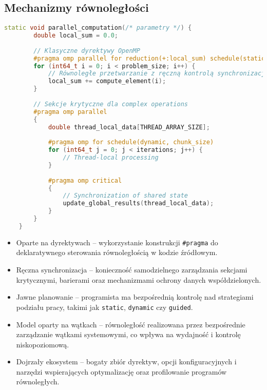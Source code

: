 \subsection{Mechanizmy równoległości}
\begin{lstlisting}[language=C++, caption={Mechanizmy równoległości w benchmarkach C++ z OpenMP}, label={lst:openmp_parallelism}]
    static void parallel_computation(/* parametry */) {
        double local_sum = 0.0;
        
        // Klasyczne dyrektywy OpenMP
        #pragma omp parallel for reduction(+:local_sum) schedule(static)
        for (int64_t i = 0; i < problem_size; i++) {
            // Równoległe przetwarzanie z ręczną kontrolą synchronizacji
            local_sum += compute_element(i);
        }
        
        // Sekcje krytyczne dla complex operations
        #pragma omp parallel
        {
            double thread_local_data[THREAD_ARRAY_SIZE];
            
            #pragma omp for schedule(dynamic, chunk_size)
            for (int64_t j = 0; j < iterations; j++) {
                // Thread-local processing
            }
            
            #pragma omp critical
            {
                // Synchronization of shared state
                update_global_results(thread_local_data);
            }
        }
    }
\end{lstlisting}
\begin{itemize}
    \item Oparte na dyrektywach – wykorzystanie konstrukcji \texttt{\#pragma} do deklaratywnego sterowania równoległością w kodzie źródłowym.
    
    \item Ręczna synchronizacja – konieczność samodzielnego zarządzania sekcjami krytycznymi, barierami oraz mechanizmami ochrony danych współdzielonych.
    
    \item Jawne planowanie – programista ma bezpośrednią kontrolę nad strategiami podziału pracy, takimi jak \texttt{static}, \texttt{dynamic} czy \texttt{guided}.
    
    \item Model oparty na wątkach – równoległość realizowana przez bezpośrednie zarządzanie wątkami systemowymi, co wpływa na wydajność i kontrolę niskopoziomową.
    
    \item Dojrzały ekosystem – bogaty zbiór dyrektyw, opcji konfiguracyjnych i narzędzi wspierających optymalizację oraz profilowanie programów równoległych.
\end{itemize}
  
